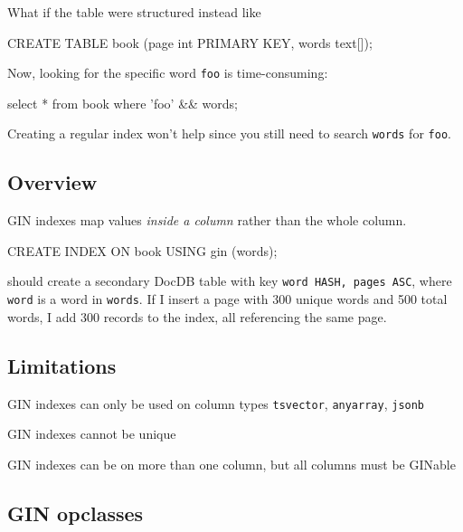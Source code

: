 \documentclass[11pt]{article}
\begin{document}
What if the table were structured instead like

\begin{sqlcode}
CREATE TABLE book (page int PRIMARY KEY, words text[]);
\end{sqlcode}

Now, looking for the specific word \texttt{foo} is time-consuming:

\begin{sqlcode}
select * from book where '{foo}' && words;
\end{sqlcode}

Creating a regular index won't help since you still need to search
\texttt{words} for \texttt{foo}.

\hypertarget{overview}{%
\subsection{Overview}\label{overview}}

GIN indexes map values \emph{inside a column} rather than the whole
column.

\begin{sqlcode}
CREATE INDEX ON book USING gin (words);
\end{sqlcode}

should create a secondary DocDB table with key
\texttt{word\ HASH,\ pages\ ASC}, where \texttt{word} is a word in
\texttt{words}. If I insert a page with 300 unique words and 500 total
words, I add 300 records to the index, all referencing the same page.

\hypertarget{limitations}{%
\subsection{Limitations}\label{limitations}}

\begin{oparts}
\item
  GIN indexes can only be used on column types \texttt{tsvector},
  \texttt{anyarray}, \texttt{jsonb}
\item
  GIN indexes cannot be unique
\item
  GIN indexes can be on more than one column, but all columns must be
  GINable
\end{oparts}

\hypertarget{gin-opclasses}{%
\subsection{GIN opclasses}\label{gin-opclasses}}
\end{document}
